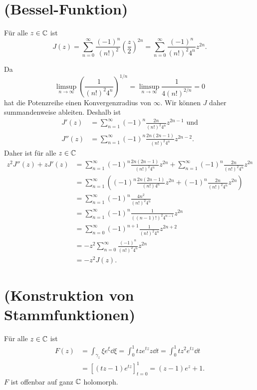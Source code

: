 \documentclass[a4paper,10pt]{article}
\begin{document}
\section{(Bessel-Funktion)}
Für alle $z \in \mathbb{C}$ ist
\[
 J(z)
 = \sum_{n=0}^\infty \frac{(-1)^n}{(n!)^2} \left( \frac{z}{2} \right)^{2n}
 = \sum_{n=0}^\infty \frac{(-1)^n}{(n!)^2 4^n} z^{2n}.
\]

Da
\[
 \limsup_{n \to \infty} \left( \frac{1}{(n!)^2 4^n} \right)^{1/n} = \limsup_{n \to \infty} \frac{1}{4 (n!)^{2/n}} = 0
\]
hat die Potenzreihe einen Konvergenzradius von $\infty$. Wir können $J$ daher summandenweise ableiten. Deshalb ist
\begin{align*}
  J'(z) &= \sum_{n=1}^\infty (-1)^n \frac{2n}{(n!)^2 4^n}{z^{2n-1}} \text{ und} \\
 J''(z) &= \sum_{n=1}^\infty (-1)^n \frac{2n (2n-1)}{(n!)^2 4^n} z^{2n-2}.
\end{align*}
Daher ist für alle $z \in \mathbb{C}$
\begin{align*}
 z^2 J''(z) + z J'(z)
 &= \sum_{n=1}^\infty (-1)^n \frac{2n(2n-1)}{(n!)^2 4^n} z^{2n} + \sum_{n=1}^\infty (-1)^n \frac{2n}{(n!)^2 4^n} z^{2n} \\
 &= \sum_{n=1}^\infty \left( (-1)^n \frac{2n(2n-1)}{(n!)4^n} z^{2n} + (-1)^n \frac{2n}{(n!)^2 4^n} z^{2n} \right) \\
 &= \sum_{n=1}^\infty (-1)^n \frac{4n^2}{(n!)^2 4^n} \\
 &= \sum_{n=1}^\infty (-1)^n \frac{1}{((n-1)!)^2 4^{n-1}} z^{2n} \\
 &= \sum_{n=0}^\infty (-1)^{n+1} \frac{1}{(n!)^2 4^n} z^{2n+2} \\
 &= -z^2 \sum_{n=0}^\infty \frac{(-1)^n}{(n!)^2 4^n} z^{2n} \\
 &= -z^2 J(z).
\end{align*}





\section{(Konstruktion von Stammfunktionen)}
Für alle $z \in \mathbb{C}$ ist
\begin{align*}
 F(z)
 &= \int_{\gamma_z} \xi e^{\xi} \dd{\xi}
 = \int_0^1 tz e^{tz} z \dd{t}
 = \int_0^1 t z^2 e^{tz} \dd{t} \\
 &= \left[ (tz-1) e^{tz} \right]_{t=0}^1
 = (z-1)e^z + 1.
\end{align*}
$F$ ist offenbar auf ganz $\mathbb{C}$ holomorph.
\end{document}
